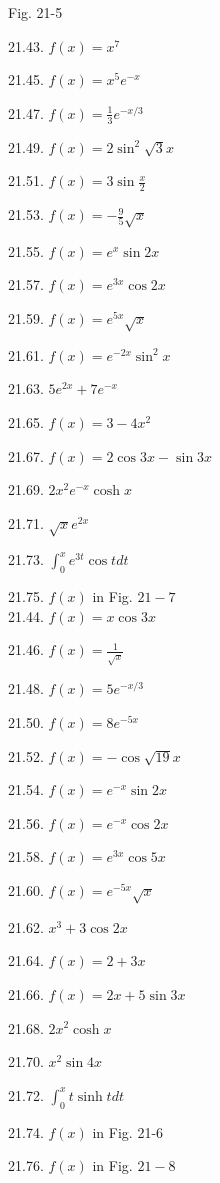 \documentclass[10pt]{article}
\begin{document}
Fig. 21-5

21.43. $f(x)=x^{7}$

21.45. $f(x)=x^{5} e^{-x}$

21.47. $f(x)=\frac{1}{3} e^{-x / 3}$

21.49. $f(x)=2 \sin ^{2} \sqrt{3} x$

21.51. $f(x)=3 \sin \frac{x}{2}$

21.53. $f(x)=-\frac{9}{5} \sqrt{x}$

21.55. $f(x)=e^{x} \sin 2 x$

21.57. $f(x)=e^{3 x} \cos 2 x$

21.59. $f(x)=e^{5 x} \sqrt{x}$

21.61. $f(x)=e^{-2 x} \sin ^{2} x$

21.63. $5 e^{2 x}+7 e^{-x}$

21.65. $f(x)=3-4 x^{2}$

21.67. $f(x)=2 \cos 3 x-\sin 3 x$

21.69. $2 x^{2} e^{-x} \cosh x$

21.71. $\sqrt{x} e^{2 x}$

21.73. $\int_{0}^{x} e^{3 t} \cos t d t$

21.75. $f(x)$ in Fig. $21-7$\\
21.44. $f(x)=x \cos 3 x$

21.46. $f(x)=\frac{1}{\sqrt{x}}$

21.48. $f(x)=5 e^{-x / 3}$

21.50. $f(x)=8 e^{-5 x}$

21.52. $f(x)=-\cos \sqrt{19} x$

21.54. $f(x)=e^{-x} \sin 2 x$

21.56. $f(x)=e^{-x} \cos 2 x$

21.58. $f(x)=e^{3 x} \cos 5 x$

21.60. $f(x)=e^{-5 x} \sqrt{x}$

21.62. $x^{3}+3 \cos 2 x$

21.64. $f(x)=2+3 x$

21.66. $f(x)=2 x+5 \sin 3 x$

21.68. $2 x^{2} \cosh x$

21.70. $x^{2} \sin 4 x$

21.72. $\int_{0}^{x} t \sinh t d t$

21.74. $f(x)$ in Fig. 21-6

21.76. $f(x)$ in Fig. $21-8$
\end{document}
